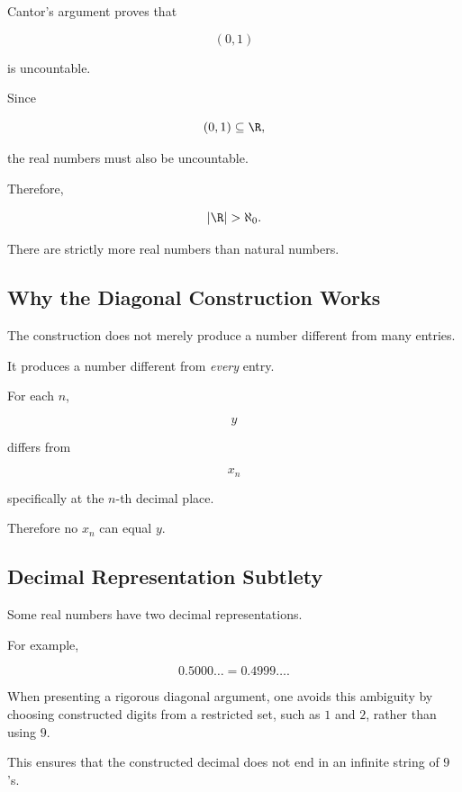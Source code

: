 Cantor's argument proves that

\[ (0,1) \]

is uncountable.

Since

\[ (0,1)\subseteq\R, \]

the real numbers must also be uncountable.

Therefore,

\[ |\R|>\aleph_0. \]

There are strictly more real numbers than natural numbers.

\subsection{Why the Diagonal Construction Works}
\label{subsec:why-diagonal-works}

The construction does not merely produce a number different from many entries.

It produces a number different from \emph{every} entry.

For each \(n\),

\[ y \]

differs from

\[ x_n \]

specifically at the \(n\)-th decimal place.

Therefore no \(x_n\) can equal \(y\).

\subsection{Decimal Representation Subtlety}
\label{subsec:decimal-representation-subtlety}

Some real numbers have two decimal representations.

For example,

\[ 0.5000\ldots=0.4999\ldots. \]

When presenting a rigorous diagonal argument, one avoids this ambiguity by
choosing constructed digits from a restricted set, such as \(1\) and \(2\),
rather than using \(9\).

This ensures that the constructed decimal does not end in an infinite string
of \(9\)'s.

